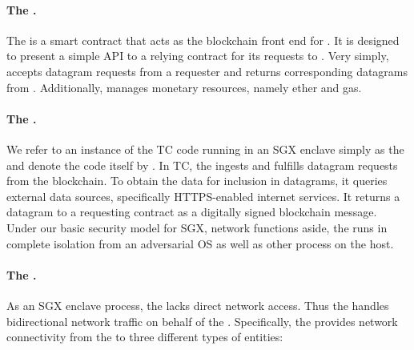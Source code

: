 \vspace{-2mm}
\paragraph{The \tcontract \tcont.} The \tcontract is a smart contract that acts as the blockchain front end for \tc. It is designed to present a simple API to a relying contract \reqcont for its requests to \tc. Very simply, \tcont accepts datagram requests from a requester \reqcont and returns corresponding datagrams from \tc. Additionally, \tcont manages \tc monetary resources, namely ether and gas.

\vspace{-2mm}
\paragraph{The \encname.}
We refer to an instance of the TC code running in an SGX enclave simply as the \encname and denote the code itself by  \engine. In TC, the \encname ingests and fulfills datagram requests from the blockchain. To obtain the data for inclusion in datagrams, it queries external data sources, specifically HTTPS-enabled internet services. It returns a datagram to a requesting contract \reqcont as a digitally signed blockchain message. Under our basic security model for SGX, network functions aside, the \encname runs in complete isolation from an adversarial OS as well as other process on the host. 

\vspace{-2mm}
\paragraph{The \medname \relay.} As an SGX enclave process, the \encname lacks direct network access. Thus the \medname handles bidirectional network traffic on behalf of the \encname. Specifically, the \medname provides network connectivity from the \encname to three different types of entities: 

